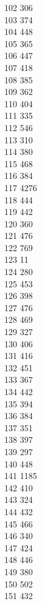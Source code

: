 { 102	306 \\
 103	374 \\
 104	448 \\
 105	365 \\
 106	447 \\
 107	418 \\
 108	385 \\
 109	362 \\
 110	404 \\
 111	335 \\
 112	546 \\
 113	310 \\
 114	380 \\
 115	468 \\
 116	384 \\
 117	4276 \\
 118	444 \\
 119	442 \\
 120	360 \\
 121	476 \\
 122	769 \\
 123	11 \\
 124	280 \\
 125	453 \\
 126	398 \\
 127	476 \\
 128	469 \\
 129	327 \\
 130	406 \\
 131	416 \\
 132	451 \\
 133	367 \\
 134	442 \\
 135	394 \\
 136	384 \\
 137	351 \\
 138	397 \\
 139	297 \\
 140	448 \\
 141	1185 \\
 142	410 \\
 143	324 \\
 144	432 \\
 145	466 \\
 146	340 \\
 147	424 \\
 148	446 \\
 149	380 \\
 150	502 \\
 151	432 \\
}
